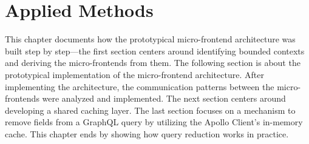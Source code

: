 \chapter{Applied Methods}\label{chapter:applied-methods}

This chapter documents how the prototypical micro-frontend architecture was built step by step—the first section centers around identifying bounded contexts and deriving the micro-frontends from them. The following section is about the prototypical implementation of the micro-frontend architecture. After implementing the architecture, the communication patterns between the micro-frontends were analyzed and implemented. The next section centers around developing a shared caching layer. The last section focuses on a mechanism to remove fields from a GraphQL query by utilizing the Apollo Client's in-memory cache. This chapter ends by showing how query reduction works in practice.








